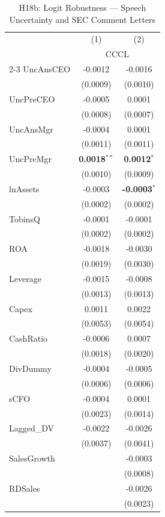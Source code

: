 \begin{landscape}
\begin{table}[H]
\setlength{\tabcolsep}{3pt}
\renewcommand{\arraystretch}{0.85}
\centering
\caption{H18b: Logit Robustness --- Speech Uncertainty and SEC Comment Letters}
\label{tab:h18b}
\scriptsize
\begin{tabular}{lcc}
\toprule
 & (1) & (2) \\
 & \multicolumn{2}{c}{CCCL} \\
\cmidrule(lr){2-3}
\midrule
UncAnsCEO & -0.0012 & -0.0016 \\
 & (0.0009) & (0.0010) \\
UncPreCEO & -0.0005 & 0.0001 \\
 & (0.0008) & (0.0007) \\
UncAnsMgr & -0.0004 & 0.0001 \\
 & (0.0011) & (0.0011) \\
UncPreMgr & \textbf{0.0018}$^{**}$ & \textbf{0.0012}$^{*}$ \\
 & (0.0010) & (0.0009) \\
\midrule
lnAssets & -0.0003 & \textbf{-0.0003}$^{*}$ \\
 & (0.0002) & (0.0002) \\
TobinsQ & -0.0001 & -0.0001 \\
 & (0.0002) & (0.0002) \\
ROA & -0.0018 & -0.0030 \\
 & (0.0019) & (0.0030) \\
Leverage & -0.0015 & -0.0008 \\
 & (0.0013) & (0.0013) \\
Capex & 0.0011 & 0.0022 \\
 & (0.0053) & (0.0054) \\
CashRatio & -0.0006 & 0.0007 \\
 & (0.0018) & (0.0020) \\
DivDummy & -0.0004 & -0.0005 \\
 & (0.0006) & (0.0006) \\
sCFO & -0.0004 & 0.0001 \\
 & (0.0023) & (0.0014) \\
Lagged\_DV & -0.0022 & -0.0026 \\
 & (0.0037) & (0.0041) \\
SalesGrowth &  & -0.0003 \\
 &  & (0.0008) \\
RDSales &  & -0.0026 \\
 &  & (0.0023) \\

\end{tabular}
\end{table}
\end{landscape}
